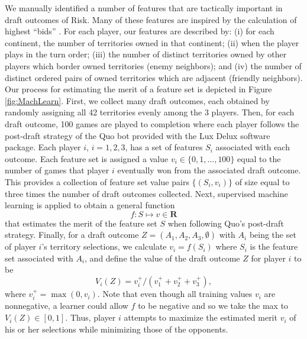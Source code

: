 \documentclass[letterpaper]{article}
\numberwithin{equation}{section}
\numberwithin{theorem}{section}
\numberwithin{lemma}{section}
\numberwithin{df}{section}
\begin{document}
We manually identified a number of features that are tactically important in draft outcomes of Risk.  Many of these features are inspired by the calculation of highest ``bids'' \cite{RiskBots}.  For each player, our features are described by: (i) for each continent, the number of territories owned in that continent; (ii) when the player plays in the turn order; (iii) the number of distinct territories owned by other players which border owned territories (enemy neighbors); and (iv) the number of distinct ordered pairs of owned territories which are adjacent (friendly neighbors).  Our process for estimating the merit of a feature set is depicted in Figure \ref{fig:MachLearn}.  First, we collect many draft outcomes, each obtained by randomly assigning all 42 territories evenly among the 3 players.  Then, for each draft outcome, 100 games are played to completion where each player follows the post-draft strategy of the Quo bot provided with the Lux Delux software package.  Each player $i$, $i=1,2,3$, has a set of features $S_i$ associated with each outcome.  Each feature set is assigned a value $v_i \in \{0,1,...,100\}$ equal to the number of games that player $i$ eventually won from the associated draft outcome.  This provides a collection of feature set value pairs $\{(S_i, v_i)\}$ of size equal to three times the number of draft outcomes collected.  Next, supervised machine learning is applied to obtain a general function
\[ f: S \mapsto v \in \textbf{R} \] 
that estimates the merit of the feature set $S$ when following Quo's post-draft strategy.  Finally, for a draft outcome $Z = (A_1,A_2,A_3,\emptyset)$ with $A_i$ being the set of player $i$'s territory selections, we calculate $v_i = f(S_i)$ where $S_i$ is the feature set associated with $A_i$, and define the value of the draft outcome $Z$ for player $i$ to be
\[ V_i(Z) = v_i^+ / \left(v_1^+ + v_2^+ + v_3^+\right), \]
where $v_i^+ = \max(0, v_i)$.  Note that even though all training values $v_i$ are nonnegative, a learner could allow $f$ to be negative and so we take the max to $V_i(Z) \in [0,1]$.  
Thus, player $i$ attempts to maximize the estimated merit $v_i$ of his or her selections while minimizing those of the opponents.
\end{document}

